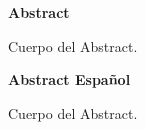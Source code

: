 {\huge\bfseries \space Abstract}
\bigskip


Cuerpo del Abstract.


\bigskip
\bigskip
\bigskip
\bigskip
\bigskip
\bigskip

{\huge\bfseries \space Abstract Español}
\bigskip



Cuerpo del Abstract.


\bigskip



\newpage